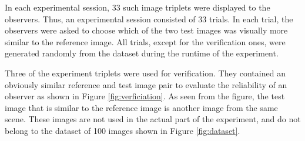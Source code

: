 In each experimental session, 33 such image triplets were displayed to the observers. Thus, an experimental session consisted of 33 trials. In each trial, the observers were asked to choose which of the two test images was visually more similar to the reference image. All trials, except for the verification ones, were generated randomly from the dataset during the runtime of the experiment. 

Three of the experiment triplets were used for verification. They contained an obviously similar reference and test image pair to evaluate the reliability of an observer as shown in Figure \ref{fig:verficiation}. As seen from the figure, the test image that is similar to the reference image is another image from the same scene. These images are not used in the actual part of the experiment, and do not belong to the dataset of 100 images shown in Figure \ref{fig:dataset}.

